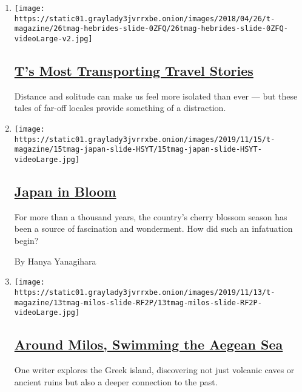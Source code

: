 \begin{enumerate}
\def\labelenumi{\arabic{enumi}.}
\item
  \texttt{[image: https://static01.graylady3jvrrxbe.onion/images/2018/04/26/t-magazine/26tmag-hebrides-slide-0ZFQ/26tmag-hebrides-slide-0ZFQ-videoLarge-v2.jpg]}

  \hypertarget{ts-most-transporting-travel-stories}{%
  \subsection{\texorpdfstring{\href{/2020/03/27/t-magazine/virtual-travel.html}{T's
  Most Transporting Travel
  Stories}}{T's Most Transporting Travel Stories}}\label{ts-most-transporting-travel-stories}}

  Distance and solitude can make us feel more isolated than ever --- but
  these tales of far-off locales provide something of a distraction.
\item
  \texttt{[image: https://static01.graylady3jvrrxbe.onion/images/2019/11/15/t-magazine/15tmag-japan-slide-HSYT/15tmag-japan-slide-HSYT-videoLarge.jpg]}

  \hypertarget{japan-in-bloom}{%
  \subsection{\texorpdfstring{\href{/2019/11/15/t-magazine/japan-cherry-blossoms.html}{Japan
  in Bloom}}{Japan in Bloom}}\label{japan-in-bloom}}

  For more than a thousand years, the country's cherry blossom season
  has been a source of fascination and wonderment. How did such an
  infatuation begin?

  By Hanya Yanagihara
\item
  \texttt{[image: https://static01.graylady3jvrrxbe.onion/images/2019/11/13/t-magazine/13tmag-milos-slide-RF2P/13tmag-milos-slide-RF2P-videoLarge.jpg]}

  \hypertarget{around-milos-swimming-the-aegean-sea}{%
  \subsection{\texorpdfstring{\href{/2019/11/14/t-magazine/milos-greece-swimming.html}{Around
  Milos, Swimming the Aegean
  Sea}}{Around Milos, Swimming the Aegean Sea}}\label{around-milos-swimming-the-aegean-sea}}

  One writer explores the Greek island, discovering not just volcanic
  caves or ancient ruins but also a deeper connection to the past.


\end{enumerate}
